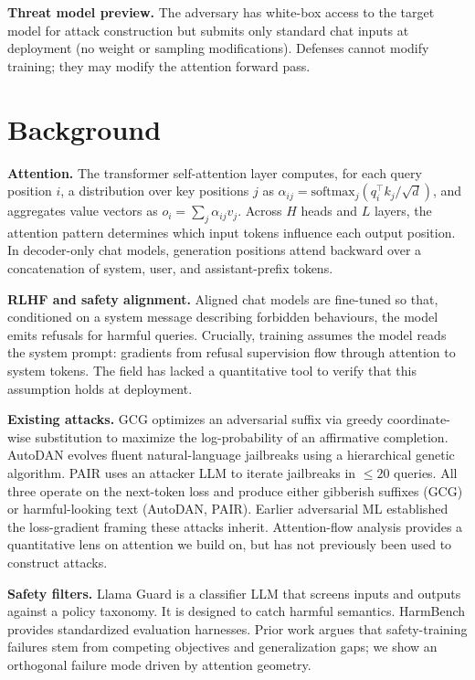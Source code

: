 \documentclass[sigconf,anonymous=false,review=false]{acmart}
\theoremstyle{definition}
\theoremstyle{remark}
\newcommand{\softmax}{\mathrm{softmax}}
\begin{document}
\textbf{Threat model preview.} The adversary has white-box access to the target model for attack construction but submits only standard chat inputs at deployment (no weight or sampling modifications). Defenses cannot modify training; they may modify the attention forward pass.

\section{Background}
\label{sec:background}

\textbf{Attention.} The transformer self-attention layer \cite{vaswani2017attention} computes, for each query position $i$, a distribution over key positions $j$ as $\alpha_{ij} = \softmax_j\!\left( q_i^\top k_j / \sqrt{d} \right)$, and aggregates value vectors as $o_i = \sum_j \alpha_{ij} v_j$. Across $H$ heads and $L$ layers, the attention pattern determines which input tokens influence each output position. In decoder-only chat models, generation positions attend backward over a concatenation of system, user, and assistant-prefix tokens.

\textbf{RLHF and safety alignment.} Aligned chat models \cite{ouyang2022training,touvron2023llama2,grattafiori2024llama3,jiang2023mistral,gemmateam2024gemma2} are fine-tuned so that, conditioned on a system message describing forbidden behaviours, the model emits refusals for harmful queries. Crucially, training assumes the model reads the system prompt: gradients from refusal supervision flow through attention to system tokens. The field has lacked a quantitative tool to verify that this assumption holds at deployment.

\textbf{Existing attacks.} GCG \cite{zou2023universal} optimizes an adversarial suffix via greedy coordinate-wise substitution to maximize the log-probability of an affirmative completion. AutoDAN \cite{liu2023autodan} evolves fluent natural-language jailbreaks using a hierarchical genetic algorithm. PAIR \cite{chao2023pair} uses an attacker LLM to iterate jailbreaks in $\leq 20$ queries. All three operate on the next-token loss and produce either gibberish suffixes (GCG) or harmful-looking text (AutoDAN, PAIR). Earlier adversarial ML \cite{goodfellow2015fgsm,madry2018pgd,carlini2017towards} established the loss-gradient framing these attacks inherit. Attention-flow analysis \cite{abnar2020rollout} provides a quantitative lens on attention we build on, but has not previously been used to construct attacks.

\textbf{Safety filters.} Llama Guard \cite{inan2023llamaguard} is a classifier LLM that screens inputs and outputs against a policy taxonomy. It is designed to catch harmful semantics. HarmBench \cite{mazeika2024harmbench} provides standardized evaluation harnesses. Prior work \cite{wei2023jailbroken} argues that safety-training failures stem from competing objectives and generalization gaps; we show an orthogonal failure mode driven by attention geometry.
\end{document}

